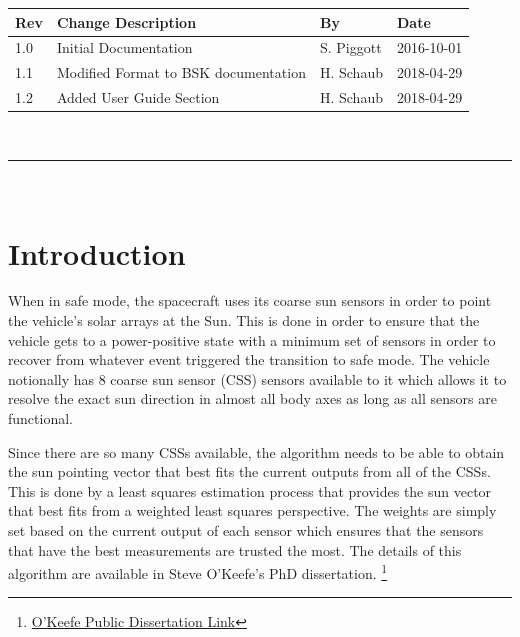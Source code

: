 \documentclass[]{BasiliskReportMemo}
\begin{document}
\makeCover

%
%
\pagestyle{empty}
{\renewcommand{\arraystretch}{2}
\noindent
\begin{longtable}{|p{0.5in}|p{3.5in}|p{1.07in}|p{0.9in}|}
\hline
{\bfseries Rev} & {\bfseries Change Description} & {\bfseries By}& {\bfseries Date} \\
\hline
1.0 & Initial Documentation & S. Piggott & 2016-10-01\\
\hline
1.1 & Modified Format to BSK documentation & H. Schaub & 2018-04-29\\
\hline
1.2 & Added User Guide Section & H. Schaub & 2018-04-29\\
\hline

\end{longtable}
}



\newpage
\setcounter{page}{1}
\pagestyle{fancy}

\tableofcontents %
~\\ \hrule ~\\ %




\section{Introduction}
When in safe mode, the spacecraft uses its coarse sun sensors in order to 
point the vehicle's solar arrays at the Sun.  This is done in order to ensure 
that the vehicle gets to a power-positive state with a minimum set of sensors 
in order to recover from whatever event triggered the transition to safe mode.  
The vehicle notionally has 8 coarse sun sensor (CSS) sensors available to it 
which allows it to resolve the exact sun direction in almost all body axes as 
long as all sensors are functional. 

Since there are so many CSSs available, the algorithm needs to be able to obtain 
the sun pointing vector that best fits the current outputs from all of the CSSs.  
This is done by a least squares estimation process that provides the sun vector 
that best fits from a weighted least squares perspective.  The weights are 
simply set based on the current output of each sensor which ensures that the 
sensors that have the best measurements are trusted the most.  The details of 
this algorithm are available in Steve O'Keefe's PhD dissertation. 
\footnote{\href{http://gradworks.umi.com/3704787.pdf}
   {O'Keefe Public Dissertation Link}}
\end{document}
